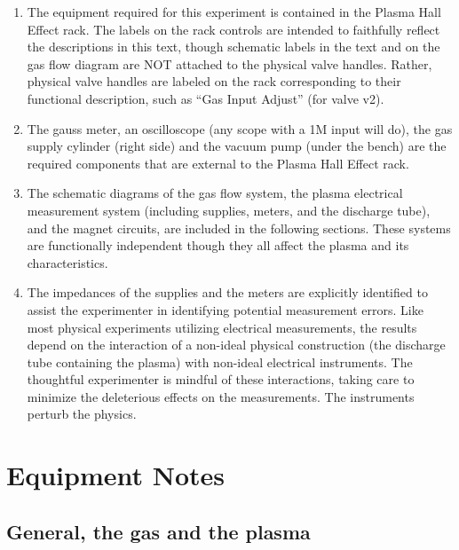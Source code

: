 \documentclass{../lab}
\begin{document}
\begin{enumerate}
    \item The equipment required for this experiment is contained in the Plasma Hall Effect rack. The labels on the rack controls are intended to faithfully reflect the descriptions in this text, though schematic labels in the text and on the gas flow diagram are NOT attached to the physical valve handles. Rather, physical valve handles are labeled on the rack corresponding to their functional description, such as ``Gas Input Adjust'' (for valve v2).

    \item The gauss meter, an oscilloscope (any scope with a 1M input will do), the gas supply cylinder (right side) and the vacuum pump (under the bench) are the required components that are external to the Plasma Hall Effect rack.

    \item The schematic diagrams of the gas flow system, the plasma electrical measurement system (including supplies, meters, and the discharge tube), and the magnet circuits, are included in the following sections. These systems are functionally independent though they all affect the plasma and its characteristics.

    \item The impedances of the supplies and the meters are explicitly identified to assist the experimenter in identifying potential measurement errors. Like most physical experiments utilizing electrical measurements, the results depend on the interaction of a non-ideal physical construction (the discharge tube containing the plasma) with non-ideal electrical instruments. The thoughtful experimenter is mindful of these interactions, taking care to minimize the deleterious effects on the measurements. The instruments perturb the physics.

\end{enumerate}

\section{Equipment Notes}

\subsection{General, the gas and the plasma}
\end{document}
